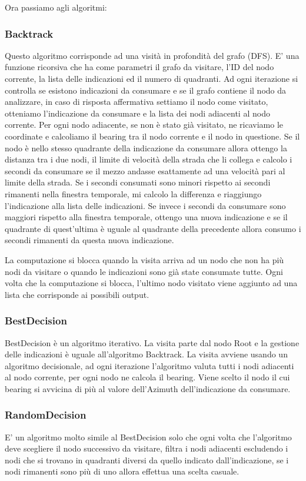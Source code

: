 \documentclass[12pt,a4paper,openright,twoside]{report}
\begin{document}
Ora passiamo agli algoritmi:

\subsubsection{Backtrack}
Questo algoritmo corrisponde ad una visità in profondità del grafo (DFS). E' una funzione ricorsiva che ha come parametri il grafo da visitare, l'ID del nodo corrente, la lista delle indicazioni ed il numero di quadranti. Ad ogni iterazione si controlla se esistono indicazioni da consumare e se il grafo contiene il nodo da analizzare, in caso di risposta affermativa settiamo il nodo come visitato, otteniamo l'indicazione da consumare e la lista dei nodi adiacenti al nodo corrente. Per ogni nodo adiacente, se non è stato già visitato, ne ricaviamo le coordinate e calcoliamo il bearing tra il nodo corrente e il nodo in questione. Se il nodo è nello stesso quadrante della indicazione da consumare allora ottengo la distanza tra i due nodi, il limite di velocità della strada che li collega e calcolo i secondi da consumare se il mezzo andasse esattamente ad una velocità pari al limite della strada. Se i secondi consumati sono minori rispetto ai secondi rimanenti nella finestra temporale, mi calcolo la differenza e riaggiungo l'indicazione alla lista delle indicazioni. Se invece i secondi da consumare sono maggiori rispetto alla finestra temporale, ottengo una nuova indicazione e se il quadrante di quest'ultima è uguale al quadrante della precedente allora consumo i secondi rimanenti da questa nuova indicazione.

La computazione si blocca quando la visita arriva ad un nodo che non ha più nodi da visitare o quando le indicazioni sono già state consumate tutte. Ogni volta che la computazione si blocca, l'ultimo nodo visitato viene aggiunto ad una lista che corrisponde ai possibili output.

\subsubsection{BestDecision}
BestDecision è un algoritmo iterativo. La visita parte dal nodo Root e la gestione delle indicazioni è uguale all'algoritmo Backtrack. La visita avviene usando un algoritmo decisionale, ad ogni iterazione l'algoritmo valuta tutti i nodi adiacenti al nodo corrente, per ogni nodo ne calcola il bearing. Viene scelto il nodo il cui bearing si avvicina di più al valore dell'Azimuth dell'indicazione da consumare. 

\subsubsection{RandomDecision}
E' un algoritmo molto simile al BestDecision solo che ogni volta che l'algoritmo deve scegliere il nodo successivo da visitare, filtra i nodi adiacenti escludendo i nodi che si trovano in quadranti diversi da quello indicato dall'indicazione, se i nodi rimanenti sono più di uno allora effettua una scelta casuale.
\end{document}
